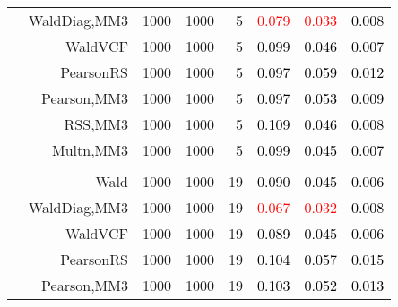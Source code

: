 \documentclass[
]{article}
\begin{document}
\begin{table}[H]
{\begin{tabular}[t]{lrrrrrrr}
\hspace{1em} & WaldDiag,MM3 & 1000 & 1000 & 5 & \textcolor{red}{0.079} & \textcolor{red}{0.033} & \textcolor{black}{0.008}\\

\hspace{1em} & WaldVCF & 1000 & 1000 & 5 & \textcolor{black}{0.099} & \textcolor{black}{0.046} & \textcolor{black}{0.007}\\

\hspace{1em} & PearsonRS & 1000 & 1000 & 5 & \textcolor{black}{0.097} & \textcolor{black}{0.059} & \textcolor{black}{0.012}\\

\hspace{1em} & Pearson,MM3 & 1000 & 1000 & 5 & \textcolor{black}{0.097} & \textcolor{black}{0.053} & \textcolor{black}{0.009}\\

\hspace{1em} & RSS,MM3 & 1000 & 1000 & 5 & \textcolor{black}{0.109} & \textcolor{black}{0.046} & \textcolor{black}{0.008}\\

\hspace{1em} & Multn,MM3 & 1000 & 1000 & 5 & \textcolor{black}{0.099} & \textcolor{black}{0.045} & \textcolor{black}{0.007}\\
\cmidrule{1-8}
\addlinespace[0.3em]
\multicolumn{8}{l}{\textbf{1F 15V}}\\
\hspace{1em} & Wald & 1000 & 1000 & 19 & \textcolor{black}{0.090} & \textcolor{black}{0.045} & \textcolor{black}{0.006}\\

\hspace{1em} & WaldDiag,MM3 & 1000 & 1000 & 19 & \textcolor{red}{0.067} & \textcolor{red}{0.032} & \textcolor{black}{0.008}\\

\hspace{1em} & WaldVCF & 1000 & 1000 & 19 & \textcolor{black}{0.089} & \textcolor{black}{0.045} & \textcolor{black}{0.006}\\

\hspace{1em} & PearsonRS & 1000 & 1000 & 19 & \textcolor{black}{0.104} & \textcolor{black}{0.057} & \textcolor{black}{0.015}\\

\hspace{1em} & Pearson,MM3 & 1000 & 1000 & 19 & \textcolor{black}{0.103} & \textcolor{black}{0.052} & \textcolor{black}{0.013}\\


\end{tabular}}
\end{table}
\end{document}
